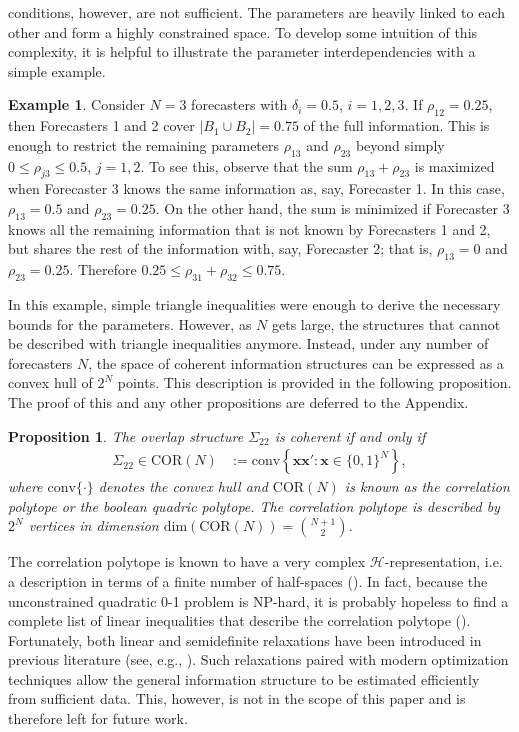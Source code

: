 \documentclass[11pt]{article}
\newtheorem{proposition}[theorem]{Proposition}
\theoremstyle{definition}
\newtheorem{example}[theorem]{Example}
\theoremstyle{definition}
\begin{document}
conditions, however, are not sufficient. The parameters are heavily linked to each other and form a highly constrained space. To develop some intuition of this complexity, it is helpful to illustrate the parameter interdependencies with a simple example. 
\begin{example}
Consider $N = 3$ forecasters with $\delta_i =  0.5$, $i = 1, 2, 3$.  If $\rho_{12} = 0.25$, then Forecasters 1 and 2 cover $|B_1 \cup B_2| = 0.75$ of the full information. This is enough to restrict the remaining parameters $\rho_{13}$ and $\rho_{23}$ beyond simply $0 \leq \rho_{j3} \leq 0.5$, $j = 1, 2$. To see this, observe that the sum $\rho_{13} + \rho_{23}$ is maximized when Forecaster 3 knows the same information as, say, Forecaster 1. In this case, $\rho_{13} = 0.5$ and  $\rho_{23} = 0.25$. On the other hand, the sum is minimized if Forecaster 3 knows all the remaining information that is not known by Forecasters 1 and 2, but shares the rest of the information with, say, Forecaster 2; that is, $\rho_{13} = 0$ and $\rho_{23} = 0.25$. Therefore  $0.25 \leq \rho_{31} + \rho_{32} \leq 0.75$. 
\end{example}
In this example, simple triangle inequalities were enough to derive the necessary bounds for the parameters. However, as $N$ gets large, the structures that cannot be described with triangle inequalities anymore. Instead, under any number of forecasters $N$, the space of coherent information structures can be expressed as a convex hull of $2^N$ points. This description is provided in the following proposition. The proof of this and any other propositions are deferred to the Appendix.

\begin{proposition}
\label{CorrelationPolytope}
The overlap structure $\Sigma_{22}$ is coherent if and only
if 
\begin{align*}
\Sigma_{22} \in \text{COR}(N) &:= \text{conv}\left\{
\boldsymbol{x}\boldsymbol{x}' : \boldsymbol{x} \in
\{0,1\}^N\right\},
\end{align*}
where $\text{conv}\{\cdot\}$ denotes the convex hull and $\text{COR}(N)$ is known as the correlation
polytope or the boolean quadric polytope. The correlation polytope is described by $2^N$
vertices in dimension $\text{dim}(\text{COR}(N)) = \binom{N+1}{2}$.
\end{proposition}
The correlation polytope is known to have a very complex
$\mathcal{H}$-representation, i.e. a description in terms of a finite
number of half-spaces (\citealt{padberg1989boolean, ziegler2000lectures}). In fact, because the unconstrained quadratic
0-1 problem is NP-hard, it is probably hopeless to find a complete
list of linear inequalities that describe the correlation polytope
(\citealt{deza1997geometry}). Fortunately, both linear and semidefinite relaxations have been introduced in previous literature (see, e.g., \citealt{laurent1997connections}). Such relaxations paired with modern optimization techniques allow the general information structure to be estimated efficiently from sufficient data. This, however, is not in the scope of this paper and is therefore left for future work. 
\end{document}
